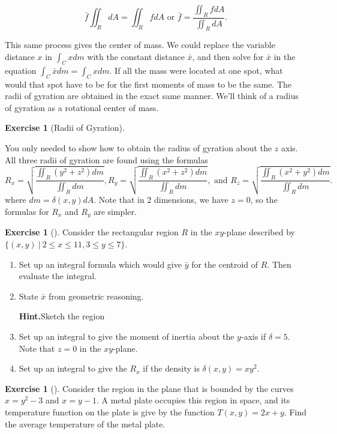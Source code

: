 \documentclass[10pt,]{book}
\theoremstyle{plain}
\theoremstyle{definition}
\theoremstyle{definition}
\theoremstyle{definition}
\theoremstyle{definition}
\newtheorem{exploration}[project]{Exercise}
\theoremstyle{definition}
\numberwithin{equation}{section}
\begin{document}
\begin{equation*}
\bar f \iint_R dA = \iint_R f dA 
\text{ or }  
\bar f  = \frac{\iint_R f dA }{\iint_R dA}
.
\end{equation*}
%
\par
This same process gives the center of mass. We could replace the variable distance \(x\) in \(\int_C x dm\) with the constant distance \(\bar x\), and then solve for \(\bar x\) in the equation \(\int_C \bar xdm = \int_C x dm\). If all the mass were located at one spot, what would that spot have to be for the first moments of mass to be the same. The radii of gyration are obtained in the exact same manner. We'll think of a radius of gyration as a rotational center of mass.%
\begin{exploration}[Radii of Gyration]\label{exploration-254}
\end{exploration}
You only needed to show how to obtain the radius of gyration about the \(z\) axis. All three radii of gyration are found using the formulas%
\begin{equation*}
R_x = \sqrt{\frac{\iint_R (y^2+z^2)dm}{\iint_R dm}},
R_y = \sqrt{\frac{\iint_R (x^2+z^2)dm}{\iint_R dm}},
\text{ and } 
R_z = \sqrt{\frac{\iint_R (x^2+y^2)dm}{\iint_R dm}}.
\end{equation*}
where \(dm=\delta(x,y) dA\). Note that in 2 dimensions, we have \(z=0\), so the formulas for \(R_x\) and \(R_y\) are simpler.%
\begin{exploration}[]\label{exploration-255}
Consider the rectangular region \(R\) in the \(xy\)-plane described by \(\{(x,y)\ |\ 2\leq x\leq 11, 3\leq y\leq 7\}\).%
\begin{enumerate}[font=\bfseries,label=(\alph*),ref=\alph*]
\item\label{task-707} Set up an integral formula which would give \(\bar y\) for the centroid of \(R\).  Then evaluate the integral.%
\item\label{task-708} State \(\bar x\) from geometric reasoning.%
\par\medskip\noindent%
\textbf{Hint.}\quad Sketch the region%
\item\label{task-709} Set up an integral to give the moment of inertia about the \(y\)-axis if \(\delta=5\). Note that \(z=0\) in the \(xy\)-plane.%
\item\label{task-710} Set up an integral to give the \(R_x\) if the density is \(\delta(x,y)=xy^2\).%
\end{enumerate}
\end{exploration}
\begin{exploration}[]\label{exploration-256}
Consider the region in the plane that is bounded by the curves \(x=y^2-3\) and \(x=y-1\). A metal plate occupies this region in space, and its temperature function on the plate is give by the function \(T(x,y)=2x+y\). Find the average temperature of the metal plate.%
\end{exploration}
\end{document}
